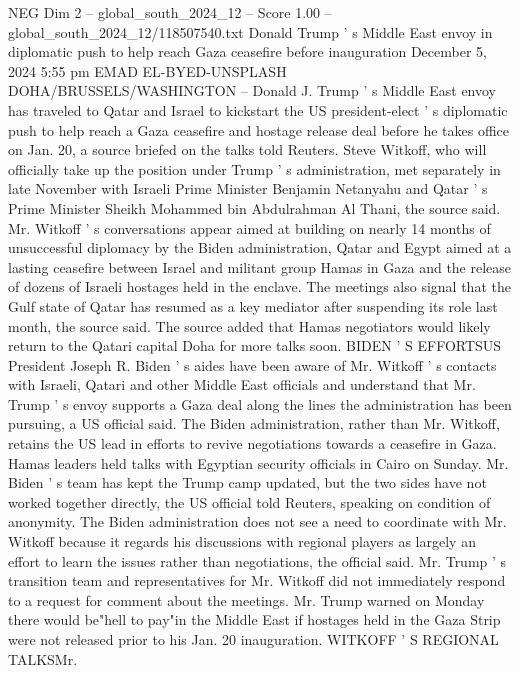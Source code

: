 \begin{textsample}{NEG Dim 2 – global\_south\_2024\_12 – Score 1.00 – global\_south\_2024\_12/118507540.txt}  \label{ex:f2_neg_384}
Donald Trump ' s Middle East envoy in diplomatic push to help reach Gaza ceasefire before inauguration December 5, 2024 5:55 pm EMAD EL-BYED-UNSPLASH DOHA/BRUSSELS/WASHINGTON -- Donald J.
Trump ' s Middle East envoy has traveled to Qatar and Israel to kickstart the US president-elect ' s diplomatic push to help reach a Gaza ceasefire and hostage release deal before he takes office on Jan. 20, a source briefed on the talks told Reuters.
Steve Witkoff, who will officially take up the position under Trump ' s administration, met separately in late November with Israeli Prime Minister Benjamin Netanyahu and Qatar ' s Prime Minister Sheikh Mohammed bin Abdulrahman Al Thani, the source said.
Mr.
Witkoff ' s conversations appear aimed at building on nearly 14 months of unsuccessful diplomacy by the Biden administration, Qatar and Egypt aimed at a lasting ceasefire between Israel and militant group Hamas in Gaza and the release of dozens of Israeli hostages held in the enclave.
The meetings also signal that the Gulf state of Qatar has resumed as a key mediator after suspending its role last month, the source said.
The source added that Hamas negotiators would likely return to the Qatari capital Doha for more talks soon.
BIDEN ' S EFFORTSUS President Joseph R.
Biden ' s aides have been aware of Mr.
Witkoff ' s contacts with Israeli, Qatari and other Middle East officials and understand that Mr.
Trump ' s envoy supports a Gaza deal along the lines the administration has been pursuing, a US official said.
The Biden administration, rather than Mr.
Witkoff, retains the US lead in efforts to revive negotiations towards a ceasefire in Gaza.
Hamas leaders held talks with Egyptian security officials in Cairo on Sunday.
Mr.
Biden ' s team has kept the Trump camp updated, but the two sides have not worked together directly, the US official told Reuters, speaking on condition of anonymity.
The Biden administration does not see a need to coordinate with Mr.
Witkoff because it regards his discussions with regional players as largely an effort to learn the issues rather than negotiations, the official said.
Mr.
Trump ' s transition team and representatives for Mr.
Witkoff did not immediately respond to a request for comment about the meetings.
Mr.
Trump warned on Monday there would be"hell to pay"in the Middle East if hostages held in the Gaza Strip were not released prior to his Jan. 20 inauguration.
WITKOFF ' S REGIONAL TALKSMr.

\end{textsample}
